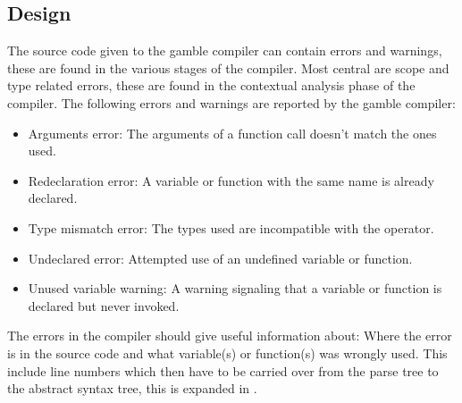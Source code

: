 \subsection*{Design}\label{subsec:DesignErrorHandling}
The source code given to the \gls{gamble} compiler can contain errors and warnings, these are found in the various stages of the compiler.
Most central are scope and type related errors, these are found in the contextual analysis phase of the compiler. 
The following errors and warnings are reported by the \gls{gamble} compiler:
\begin{itemize}
	\item Arguments error: The arguments of a function call doesn't match the ones used.
	\item Redeclaration error: A variable or function with the same name is already declared.
	\item Type mismatch error: The types used are incompatible with the operator. 
	\item Undeclared error: Attempted use of an undefined variable or function.
	\item Unused variable warning: A warning signaling that a variable or function is declared but never invoked.
\end{itemize} 
The errors in the compiler should give useful information about: Where the error is in the source code and what variable(s) or function(s) was wrongly used.
This include line numbers which then have to be carried over from the parse tree to the abstract syntax tree, this is expanded in .

